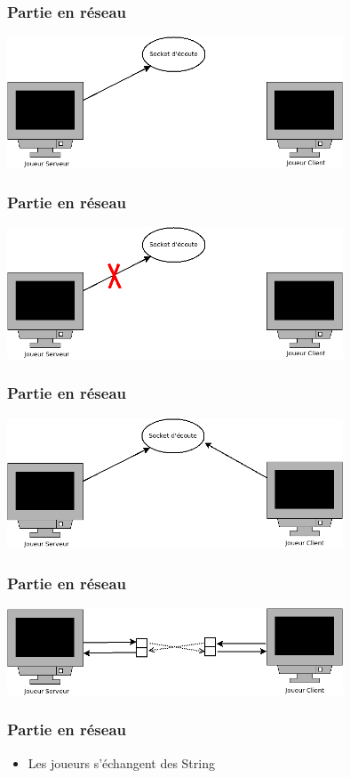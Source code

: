 \documentclass{beamer}
\begin{document}
    \begin{frame}
        \frametitle{Partie en r\'eseau}
        \includegraphics[width=10cm]{ecoute.png}
    \end{frame}
    \begin{frame}
        \frametitle{Partie en r\'eseau}
        \includegraphics[width=10cm]{annuation.png}
    \end{frame}
    \begin{frame}
        \frametitle{Partie en r\'eseau}
        \includegraphics[width=10cm]{accept.png}
    \end{frame}
    \begin{frame}
        \frametitle{Partie en r\'eseau}
        \includegraphics[width=10cm]{echange.png}
    \end{frame}
    \begin{frame}
        \frametitle{Partie en r\'eseau}
        \begin{itemize}
        \item Les joueurs s'\'echangent des String
        \end{itemize}
    \end{frame}
\end{document}
